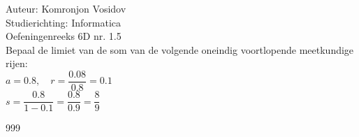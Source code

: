 \documentclass[a4paper]{article}
\begin{document}
	
	\noindent \large Auteur: Komronjon Vosidov \\
	\noindent \large Studierichting: Informatica\\
	\noindent \large Oefeningenreeks 6D nr. 1.5\\
	
	
	\medskip
	\normalsize
	Bepaal de limiet van de som van de volgende oneindig voortlopende meetkundige rijen:\\
	
	$a = 0.8,\quad r = \dfrac{0.08}{0.8} = 0.1$\\
	
	$s = \dfrac{0.8}{1 - 0.1} = \dfrac{0.8}{0.9} = \dfrac{8}{9}$
	
	
	
	
	
	
	
	\begin{thebibliography}{999}
	\end{thebibliography}		
\end{document}
